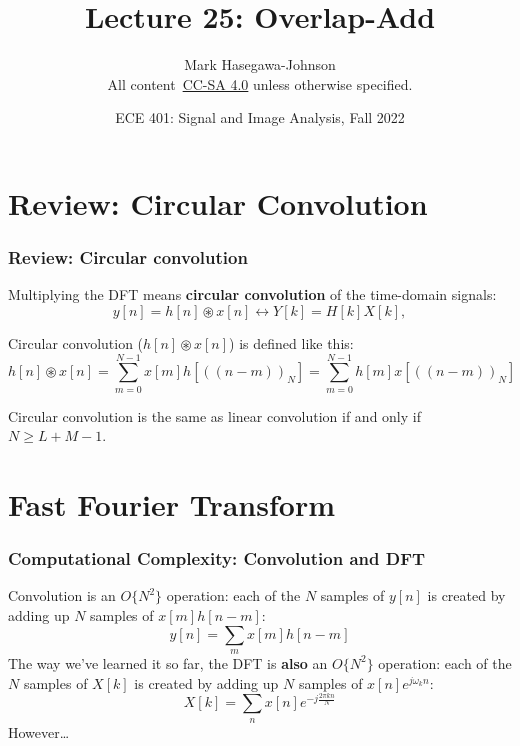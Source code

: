\documentclass{beamer}
\title{Lecture 25: Overlap-Add}
\author{Mark Hasegawa-Johnson\\All content~\href{https://creativecommons.org/licenses/by-sa/4.0/}{CC-SA 4.0} unless otherwise specified.}
\date{ECE 401: Signal and Image Analysis, Fall 2022}
\begin{document}
\begin{frame}
  \maketitle
\end{frame}

\begin{frame}
  \tableofcontents
\end{frame}

\section[Review]{Review: Circular Convolution}
\setcounter{subsection}{1}

\begin{frame}
  \frametitle{Review: Circular convolution}

  Multiplying the DFT means {\bf circular convolution} of the time-domain signals:
  \begin{displaymath}
    y[n]=h[n]\circledast x[n] \leftrightarrow Y[k] = H[k]X[k],
  \end{displaymath}
  
  Circular convolution ($h[n]\circledast x[n]$) is defined like this:
  \begin{displaymath}
    h[n]\circledast x[n] = \sum_{m=0}^{N-1}x[m]h\left[(\!(n-m)\!)_N\right]
    = \sum_{m=0}^{N-1}h[m]x\left[(\!(n-m)\!)_N\right]
  \end{displaymath}

  Circular convolution is the same as linear convolution if and only if $N\ge L+M-1$.
\end{frame}

\section[FFT]{Fast Fourier Transform}
\setcounter{subsection}{1}

\begin{frame}
  \frametitle{Computational Complexity: Convolution and DFT}

  Convolution is an $O\{N^2\}$ operation: each of the $N$ samples of
  $y[n]$ is created by adding up $N$ samples of $x[m]h[n-m]$:
  \begin{displaymath}
    y[n] = \sum_m x[m] h[n-m]
  \end{displaymath}
  The way we've learned it so far, the DFT is {\bf also} an $O\{N^2\}$
  operation: each of the $N$ samples of $X[k]$ is created by adding up
  $N$ samples of $x[n]e^{j\omega_k n}$:
  \begin{displaymath}
    X[k] = \sum_n x[n] e^{-j\frac{2\pi kn}{N}}
  \end{displaymath}
  However\ldots
\end{frame}
\end{document}

